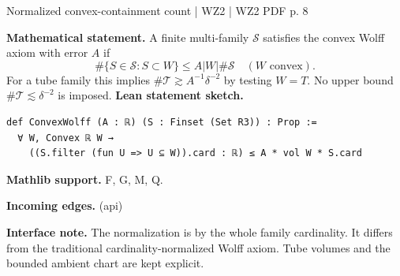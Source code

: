 \documentclass[10pt,a4paper]{article}
\newcommand{\nodecard}[1]{\hyperlink{node-#1}{\texttt{\detokenize{#1}}}}
\begin{document}
\begin{minipage}{\linewidth}
\hypertarget{node-W2CWA}{}
\begin{tcolorbox}[colback=white,colframe=setupfg,colbacktitle=setupbg,coltitle=ink,boxrule=0.45pt,arc=1.6mm,left=3mm,right=3mm,top=2mm,bottom=2mm,title={\sffamily\bfseries WZ2 Definition 2.5 \hfill \texttt{W2CWA}}]
{\sffamily\small\color{muted}Normalized convex-containment count | WZ2 | WZ2 PDF p. 8}\par
\textbf{Mathematical statement.} A finite multi-family $\mathcal S$ satisfies the convex Wolff axiom with error $A$ if
\[\#\{S\in\mathcal S:S\subset W\}\le A|W|\#\mathcal S\quad(W\text{ convex}).\]
For a tube family this implies $\#\mathcal T\gtrsim A^{-1}\delta^{-2}$ by testing $W=T$.
No upper bound $\#\mathcal T\lesssim\delta^{-2}$ is imposed.
\smallskip\textbf{Lean statement sketch.}
\begin{Verbatim}[fontsize=\small,breaklines=true,breakanywhere=true,tabsize=2]
def ConvexWolff (A : ℝ) (S : Finset (Set R3)) : Prop :=
  ∀ W, Convex ℝ W →
    ((S.filter (fun U => U ⊆ W)).card : ℝ) ≤ A * vol W * S.card
\end{Verbatim}
{\footnotesize\textbf{Mathlib support.} F, G, M, Q.\par
\textbf{Incoming edges.} \nodecard{Igeom} (api)\par}
{\footnotesize\textbf{Interface note.} The normalization is by the whole family cardinality. It differs from the traditional cardinality-normalized Wolff axiom. Tube volumes and the bounded ambient chart are kept explicit.}
\end{tcolorbox}\end{minipage}\par\medskip
\end{document}
